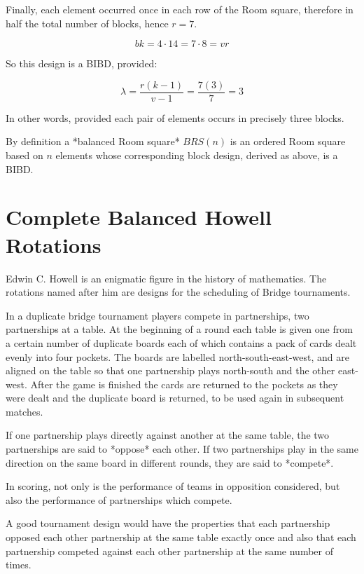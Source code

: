 \documentclass[11pt, a4paper]{book}\usepackage[]{graphicx}\usepackage[]{xcolor}
\begin{document}
Finally, each element occurred
once in each row of the Room square, therefore in half the
total number of blocks, hence $r = 7$.

\begin{equation}
bk = 4\cdot 14 = 7 \cdot 8 = vr
\end{equation}

So this design is a BIBD, provided:

\begin{equation}
\lambda = \frac{r(k - 1)}{v - 1} = \frac{7(3)}{7} = 3
\end{equation}

In other words, provided each pair of elements occurs in
precisely three blocks.

By definition a *balanced Room square* $BRS(n)$ is an
ordered Room square based on $n$ elements whose
corresponding block design, derived as above, is a BIBD.

\section{Complete Balanced Howell Rotations}

Edwin C. Howell is an enigmatic figure in the history of
mathematics.  The rotations named after him are designs for
the scheduling of Bridge tournaments.

In a duplicate bridge tournament players compete in
partnerships, two partnerships at a table. At the beginning
of a round each table is given one from a certain number of
duplicate boards each of which contains a pack of cards
dealt evenly into four pockets. The boards are labelled
north-south-east-west, and are aligned on the table so that
one partnership plays north-south and the other east-west.
After the game is finished the cards are returned to the
pockets as they were dealt and the duplicate board is
returned, to be used again in subsequent matches.

If one partnership plays directly against another at the
same table, the two partnerships are said to *oppose* each
other. If two partnerships play in the same direction on the
same board in different rounds, they are said to *compete*.

In scoring, not only is the performance of teams in
opposition considered, but also the performance of
partnerships which compete.

A good tournament design would have the properties that each
partnership opposed each other partnership at the same table
exactly once and also that each partnership competed against
each other partnership at the same number of times.
\end{document}
